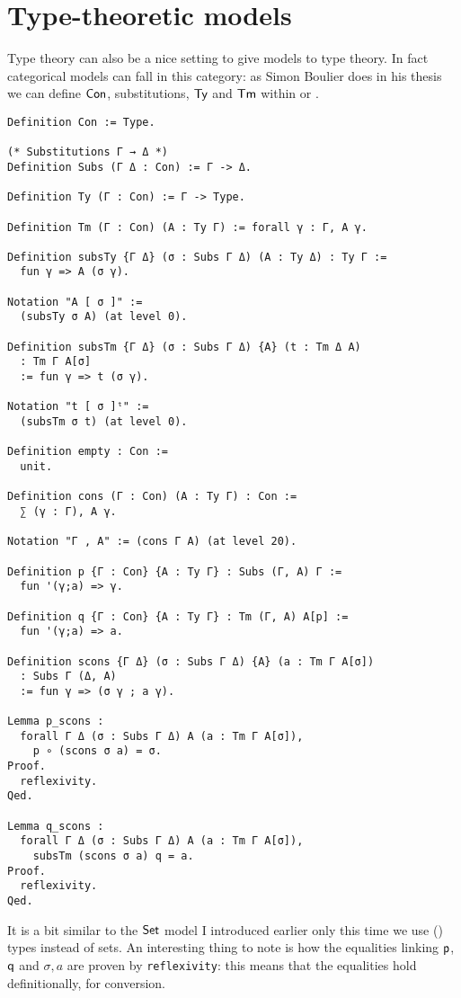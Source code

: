 \section{Type-theoretic models}

Type theory can also be a nice setting to give models to type theory.
In fact categorical models can fall in this category: as Simon Boulier does
in his thesis~ we can define \(\mathsf{Con}\),
substitutions, \(\mathsf{Ty}\) and \(\mathsf{Tm}\) within \Coq or \Agda.
\begin{verbatim}
Definition Con := Type.

(* Substitutions Γ → Δ *)
Definition Subs (Γ Δ : Con) := Γ -> Δ.

Definition Ty (Γ : Con) := Γ -> Type.

Definition Tm (Γ : Con) (A : Ty Γ) := forall γ : Γ, A γ.

Definition subsTy {Γ Δ} (σ : Subs Γ Δ) (A : Ty Δ) : Ty Γ :=
  fun γ => A (σ γ).

Notation "A [ σ ]" :=
  (subsTy σ A) (at level 0).

Definition subsTm {Γ Δ} (σ : Subs Γ Δ) {A} (t : Tm Δ A)
  : Tm Γ A[σ]
  := fun γ => t (σ γ).

Notation "t [ σ ]ᵗ" :=
  (subsTm σ t) (at level 0).

Definition empty : Con :=
  unit.

Definition cons (Γ : Con) (A : Ty Γ) : Con :=
  ∑ (γ : Γ), A γ.

Notation "Γ , A" := (cons Γ A) (at level 20).

Definition p {Γ : Con} {A : Ty Γ} : Subs (Γ, A) Γ :=
  fun '(γ;a) => γ.

Definition q {Γ : Con} {A : Ty Γ} : Tm (Γ, A) A[p] :=
  fun '(γ;a) => a.

Definition scons {Γ Δ} (σ : Subs Γ Δ) {A} (a : Tm Γ A[σ])
  : Subs Γ (Δ, A)
  := fun γ => (σ γ ; a γ).

Lemma p_scons :
  forall Γ Δ (σ : Subs Γ Δ) A (a : Tm Γ A[σ]),
    p ∘ (scons σ a) = σ.
Proof.
  reflexivity.
Qed.

Lemma q_scons :
  forall Γ Δ (σ : Subs Γ Δ) A (a : Tm Γ A[σ]),
    subsTm (scons σ a) q = a.
Proof.
  reflexivity.
Qed.
\end{verbatim}

It is a bit similar to the \(\mathsf{Set}\) model I introduced earlier only this time
we use (\Coq) types instead of sets.
An interesting thing to note is how the equalities linking \(\mathsf{p}\), \(\mathsf{q}\)
and \(\sigma, a\) are proven by \texttt{reflexivity}: this means that
the equalities hold definitionally, \ie for conversion.

